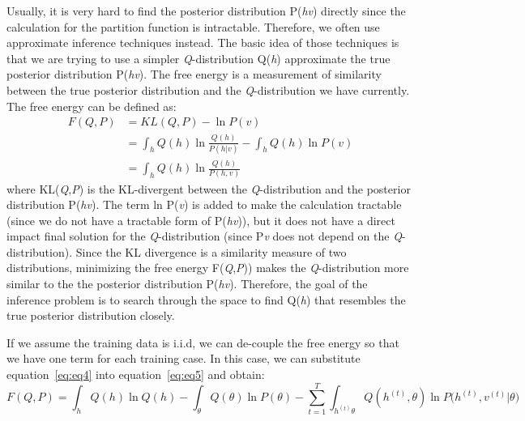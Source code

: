 \documentclass{article} %
\begin{document}
Usually, it is very hard to find the posterior distribution P(\textit{h}\textbar\textit{v}) directly since the calculation for the partition function is intractable. Therefore, we often use approximate inference techniques instead. The basic idea of those techniques is that we are trying to use a simpler \textit{Q}-distribution Q(\textit{h}) approximate the true posterior distribution P(\textit{h}\textbar\textit{v}). The free energy is a measurement of similarity between the true posterior distribution and the \textit{Q}-distribution we have currently. The free energy can be defined as:
\begin{equation} \label{eq:eq5}
\begin{split}
F(Q,P) &= KL(Q,P) - \ln P(v) \\
& = \int_{h} Q(h)\ln \frac{Q(h)}{P(h|v)} - \int_{h} Q(h)\ln P(v) \\
& = \int_{h} Q(h)\ln \frac{Q(h)}{P(h,v)} 
\end{split}
\end{equation}
where KL(\textit{Q},\textit{P}) is the KL-divergent between the \textit{Q}-distribution and the posterior distribution P(\textit{h}\textbar\textit{v}). The term ln P(\textit{v}) is added to make the calculation tractable (since we do not have a tractable form of P(\textit{h}\textbar\textit{v})), but it does not have a direct impact final solution for the \textit{Q}-distribution (since P\textit{v} does not depend on the \textit{Q}-distribution). Since the KL divergence is a similarity measure of two distributions, minimizing the free energy F(\textit{Q},\textit{P})) makes the \textit{Q}-distribution more similar to the the posterior distribution P(\textit{h}\textbar\textit{v}). Therefore, the goal of the inference problem is to search through the space to find Q(\textit{h}) that resembles the true posterior distribution closely. 

If we assume the training data is i.i.d, we can de-couple the free energy so that we have one term for each training case. In this case, we can substitute equation~\ref{eq:eq4} into equation~\ref{eq:eq5} and obtain:
\begin{equation}
F(Q,P) = \int_{h} Q(h)\ln Q(h) - \int_{\theta} Q(\theta)\ln P(\theta) - \sum_{t=1}^T \int_{h^{(t)}\theta}Q(h^{(t)},\theta)\ln P\Big(h^{(t)}, v^{(t)}|\theta\Big) 
\label{eq:eq6}
\end{equation}
\end{document}
